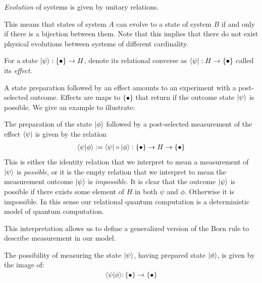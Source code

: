 \begin{axiom}
\emph{Evolution} of systems is given by unitary relations.
\end{axiom}

\noindent This means that states of system $A$ can evolve to a state of system $B$ if and only if there is a bijection between them. Note that this implies that there do not exist physical evolutions between systems of different cardinality. 

\begin{defn}
For a state $| \psi \rangle:\{\bullet\}\to H$, denote its relational converse as $\langle \psi |:H\to\{\bullet\}$ called its \emph{effect}.
\end{defn}

\noindent A state preparation followed by an effect amounts to an experiment with a post-selected outcome. Effects are maps to $\{\bullet\}$ that return if the outcome state $| \psi \rangle$ is possible.
 We give an example to illustrate:
\begin{example}
The preparation of the state $| \phi \rangle$ followed by a post-selected measurement of the effect $\langle \psi |$ is given by the relation
\begin{align*}
\langle\psi|\phi\rangle:=\langle \psi |\circ| \phi \rangle:\{\bullet\}\to H\to \{\bullet\}
\end{align*}
This is either the identity relation that we interpret to mean a measurement of $| \psi \rangle$ is \emph{possible}, or it is the empty relation that we interpret to mean the measurement outcome $| \psi \rangle$ is \emph{impossible}. It is clear that the outcome $| \psi \rangle$ is possible if there exists some element of $H$ in both $\psi$ and $\phi$. Otherwise it is impossible.
In this sense our relational quantum computation is a deterministic model of quantum computation.
\end{example}

This interpretation allows us to define a generalized version of the Born rule to describe measurement in our model.
\begin{axiom}
The possibility of measuring the state $| \psi \rangle$, having prepared state $| \phi \rangle$, is given by the image of:
\begin{align}
\langle\psi|\phi\rangle:\{\bullet\}\to\{\bullet\}
\end{align}
\end{axiom}

